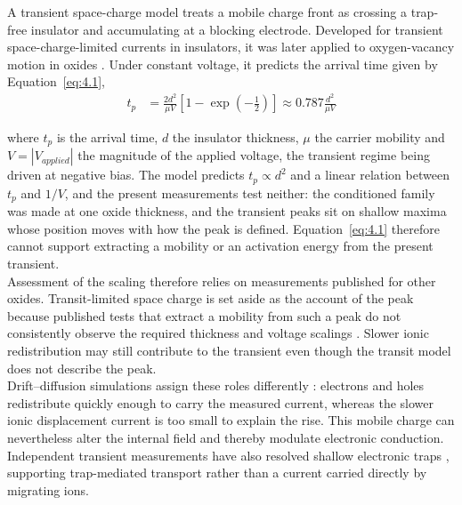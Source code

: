\noindent A transient space-charge model treats a mobile charge front as crossing a trap-free insulator and
accumulating at a blocking electrode. Developed for transient space-charge-limited currents in insulators, it was
later applied to oxygen-vacancy motion in oxides \cite{many1962theory, lampert1970current, zafar1998oxygen}. Under
constant voltage, it predicts the arrival time given by Equation~\ref{eq:4.1},
\begin{align}
t_p &= \frac{2 d^2}{\mu V} \left[ 1 - \exp\left( -\frac{1}{2} \right) \right] \approx 0.787 \frac{d^2}{\mu V} \label{eq:4.1}
\end{align}

\noindent where $t_p$ is the arrival time, $d$ the insulator thickness, $\mu$ the carrier mobility and
$V = |V_{applied}|$ the magnitude of the applied voltage, the transient regime being driven at negative bias. The
model predicts $t_p \propto d^2$ and a linear relation between $t_p$ and $1/V$, and the present measurements test
neither: the conditioned family was made at one oxide thickness, and the transient peaks sit on shallow maxima whose
position moves with how the peak is defined. Equation~\ref{eq:4.1} therefore cannot support extracting a mobility or
an activation energy from the present transient.\\

\noindent Assessment of the scaling therefore relies on measurements published for other oxides. Transit-limited
space charge is set aside as the account of the peak because published tests that extract a mobility from such a peak
do not consistently observe the required thickness and voltage scalings \cite{zafar1998oxygen, el2006space, saha2001transient}. Slower ionic redistribution may still contribute to the transient even though the transit model
does not describe the peak.\\

\noindent Drift--diffusion simulations assign these roles differently \cite{meyer2005oxygen}: electrons and holes
redistribute quickly enough to carry the measured current, whereas the slower ionic displacement current is too
small to explain the rise. This mobile charge can nevertheless alter the internal field and thereby modulate
electronic conduction. Independent transient measurements have also resolved shallow electronic traps
\cite{zhong2010transient}, supporting trap-mediated transport rather than a current carried directly by migrating
ions.\\

